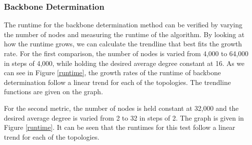 \documentclass{article}
\begin{document}
        \subsubsection{Backbone Determination}
        The runtime for the backbone determination method can be verified by varying the number of nodes and measuring the runtime of the algorithm. By looking at how the runtime grows, we can calculate the trendline that best fits the growth rate. For the first comparison, the number of nodes is varied from 4,000 to 64,000 in steps of 4,000, while holding the desired average degree constant at 16. As we can see in Figure \ref{runtime}, the growth rates of the runtime of backbone determination follow a linear trend for each of the topologies. The trendline functions are given on the graph.
        \par
        For the second metric, the number of nodes is held constant at 32,000 and the desired average degree is varied from 2 to 32 in steps of 2. The graph is given in Figure \ref{runtime}. It can be seen that the runtimes for this test follow a linear trend for each of the topologies.
        


\newpage
\end{document}
